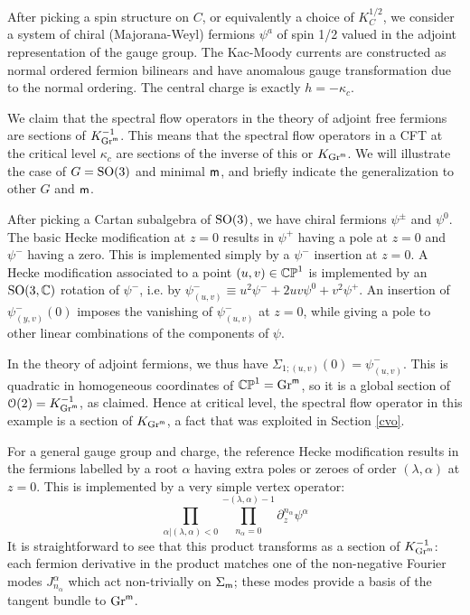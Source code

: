 \documentclass[11pt,a4paper]{article}
\begin{document}
After picking a spin structure on $C$, or equivalently a choice of $K_C^{1/2}$, we consider a system of chiral (Majorana-Weyl) fermions  $\psi^a$ of spin 1/2 
valued in the adjoint representation of the gauge group.  The Kac-Moody currents are 
constructed as normal ordered fermion bilinears and have anomalous gauge transformation due to 
the normal ordering. The central charge is exactly $h=-\kappa_c$. 

We claim that the spectral flow operators in the theory of adjoint free fermions are sections of $K^{-1}_{{\mathrm{Gr}}^{\sf m}}$.   This means that the spectral flow
operators in a CFT at the critical level $\kappa_c$ are sections of the inverse of this or $K_{{\mathrm{Gr}}^{\sf m}}$.
We will illustrate the case of $G={\mathrm{SO}}(3)$ and minimal ${\sf m}$, and briefly indicate the generalization to other $G$ and ${\sf m}$.


After picking a Cartan subalgebra of ${\mathrm{SO}}(3)$, we have
 chiral fermions $\psi^\pm$ and $\psi^0$. The basic Hecke modification at $z=0$ results in $\psi^+$ having a pole at $z=0$ and $\psi^-$ having a zero. This is implemented simply by a $\psi^-$ insertion at $z=0$. A Hecke modification associated to a point
$(u,v)\in{\mathbb{CP}}^1$ is implemented by an ${\mathrm{SO}}(3,{\mathbb C})$ rotation of $\psi^-$, i.e. by $\psi^-_{(u,v)} \equiv u^2 \psi^-  + 2 u v \psi^0 +  v^2 \psi^+$. An
insertion of $\psi^-_{(y,v)}(0)$ imposes the vanishing of  $\psi^-_{(u,v)}$ at $z=0$, while giving a pole to other linear combinations of the components of $\psi$.


In the theory of adjoint fermions, we thus have $\Sigma_{1;(u,v)}(0) = \psi^-_{(u,v)}$. 
This is quadratic in homogeneous coordinates of ${\mathbb{CP}}^1={\mathrm{Gr}}^{\sf m}$, 
so it is  a global section of ${\mathcal O}(2) = K_{{\mathrm{Gr}}^{\sf m}}^{-1}$, as claimed. 
Hence at critical level, the spectral flow operator in this example is a section of $K_{{\mathrm{Gr}}^{\sf m}}$, a fact that was exploited in Section \ref{cvo}.


For a general gauge group and charge, the reference Hecke modification results in the fermions labelled by a root $\alpha$ having extra poles or zeroes of order $(\lambda, \alpha)$ at $z=0$. This is implemented by a very simple vertex operator:
\begin{equation}\label{opspin}
\prod_{\alpha | (\lambda, \alpha)<0} \prod_{n_\alpha =0}^{-(\lambda, \alpha)-1}\partial_z^{n_{\alpha}}\psi^{\alpha}
\end{equation}
It is straightforward to see that this product transforms as a section of $K_{{\mathrm{Gr}}^{\sf m}}^{-1}$: each fermion derivative in the product matches one of the 
non-negative Fourier modes $J_{n_\alpha}^\alpha$ which act non-trivially on $\Sigma_{\sf m}$; these modes provide a basis of the tangent bundle to ${\mathrm{Gr}}^{\sf m}$.
\end{document}

